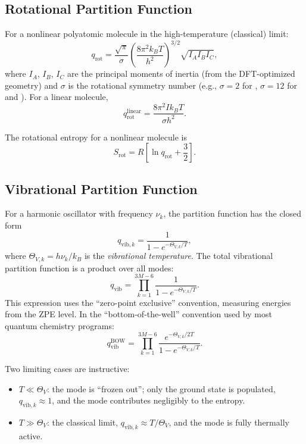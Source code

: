 \documentclass[11pt]{article}
\numberwithin{equation}{section}
\begin{document}
\subsection{Rotational Partition Function}

For a nonlinear polyatomic molecule in the high-temperature (classical) limit:
\begin{equation}
q_\text{rot} = \frac{\sqrt{\pi}}{\sigma}\left(\frac{8\pi^2 k_BT}{h^2}\right)^{3/2}\!\sqrt{I_AI_BI_C},
\label{eq:qrot}
\end{equation}
where $I_A$, $I_B$, $I_C$ are the principal moments of inertia (from the DFT-optimized geometry) and $\sigma$ is the rotational symmetry number (e.g., $\sigma = 2$ for , $\sigma = 12$ for  and ). For a linear molecule,
\begin{equation}
q_\text{rot}^\text{linear} = \frac{8\pi^2 I k_BT}{\sigma h^2}.
\end{equation}

The rotational entropy for a nonlinear molecule is
\begin{equation}
S_\text{rot} = R\left[\ln q_\text{rot} + \frac{3}{2}\right].
\end{equation}

\subsection{Vibrational Partition Function}

For a harmonic oscillator with frequency $\nu_k$, the partition function has the closed form
\begin{equation}
q_{\text{vib},k} = \frac{1}{1 - e^{-\Theta_{V,k}/T}},
\label{eq:qvib}
\end{equation}
where $\Theta_{V,k} = h\nu_k/k_B$ is the \emph{vibrational temperature}. The total vibrational partition function is a product over all modes:
\begin{equation}
q_\text{vib} = \prod_{k=1}^{3M-6}\frac{1}{1-e^{-\Theta_{V,k}/T}}.
\end{equation}
This expression uses the ``zero-point exclusive'' convention, measuring energies from the ZPE level. In the ``bottom-of-the-well'' convention used by most quantum chemistry programs:
\begin{equation}
q_\text{vib}^\text{BOW} = \prod_{k=1}^{3M-6}\frac{e^{-\Theta_{V,k}/2T}}{1-e^{-\Theta_{V,k}/T}}.
\end{equation}

Two limiting cases are instructive:
\begin{itemize}
\item $T \ll \Theta_V$: the mode is ``frozen out''; only the ground state is populated, $q_{\text{vib},k} \approx 1$, and the mode contributes negligibly to the entropy.
\item $T \gg \Theta_V$: the classical limit, $q_{\text{vib},k} \approx T/\Theta_V$, and the mode is fully thermally active.
\end{itemize}
\end{document}
